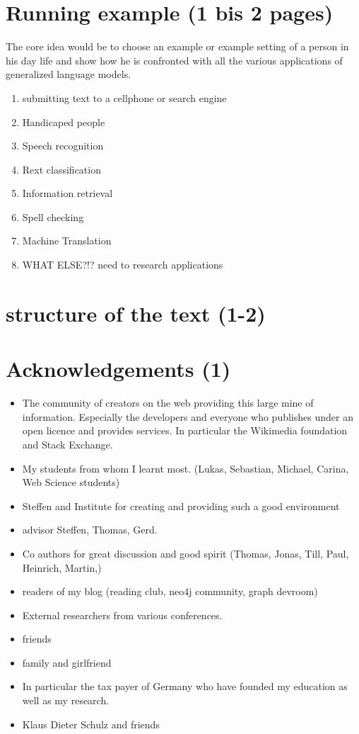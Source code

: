 \documentclass[•]{book}
\begin{document}
\section{Running example (1 bis 2 pages)}
The core idea would be to choose an example or example setting of a person in his day life and show how he is confronted with all the various applications of generalized language models.
\begin{enumerate}
\item submitting text to a cellphone or search engine
\item Handicaped people
\item Speech recognition
\item Rext classification
\item Information retrieval
\item Spell checking
\item Machine Translation
\item WHAT ELSE?!? need to research applications
\end{enumerate}



\section{structure of the text (1-2)}

\section{Acknowledgements (1)}
\begin{itemize}
\item The community of creators on the web providing this large mine of information. Especially the developers and everyone who publishes under an open licence and provides services. In particular the Wikimedia foundation and Stack Exchange. 
\item My students from whom I learnt most. (Lukas, Sebastian, Michael, Carina, Web Science students)
\item Steffen and Institute for creating and providing such a good environment
\item advisor Steffen, Thomas, Gerd.
\item Co authors for great discussion and good spirit (Thomas, Jonas, Till, Paul, Heinrich, Martin,)
\item readers of my blog (reading club, neo4j community, graph devroom)
\item External researchers from various conferences.\item friends
\item family and girlfriend
\item In particular the tax payer of Germany who have founded my education as well as my research.
\item Klaus Dieter Schulz and friends

\end{itemize}
\end{document}
